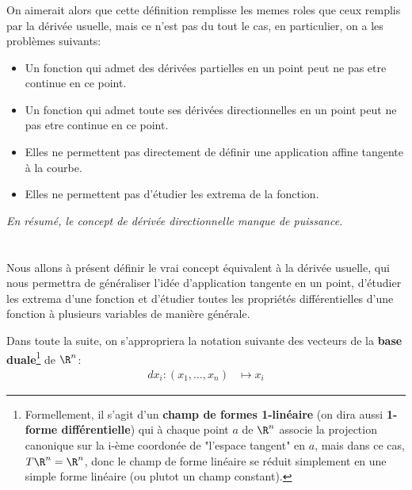 \subsection*{}
On aimerait alors que cette définition remplisse les memes roles que ceux remplis par la dérivée usuelle, mais ce n'est pas du tout le cas, en particulier, on a les problèmes suivants:
\begin{itemize}
   \item Un fonction qui admet des dérivées partielles en un point peut ne pas etre continue en ce point.
   \item Un fonction qui admet toute ses dérivées directionnelles en un point peut ne pas etre continue en ce point.
   \item Elles ne permettent pas directement de définir une application affine tangente à la courbe.
   \item Elles ne permettent pas d'étudier les extrema de la fonction.
\end{itemize}
\begin{center}
   \textit{En résumé, le concept de dérivée directionnelle manque de puissance.}
\end{center}

\chapter*{}
Nous allons à présent définir le vrai concept équivalent à la dérivée usuelle, qui nous permettra de généraliser l'idée d'application tangente en un point, d'étudier les extrema d'une fonction et d'étudier toutes les propriétés différentielles d'une fonction à plusieurs variables de manière générale.\<

Dans toute la suite, on s'appropriera la notation suivante des vecteurs de la \textbf{base duale}\footnote[1]{Formellement, il s'agit d'un \textbf{champ de formes 1-linéaire} (on dira aussi \textbf{1-forme différentielle}) qui à chaque point \(a\) de \(\R^n\) associe la projection canonique sur la i-ème coordonée de "l'espace tangent" en \(a\), mais dans ce cas, \(T\R^n = \R^n\), donc le champ de forme linéaire se réduit simplement en une simple forme linéaire (ou plutot un champ constant).} de \(\R^n\):
\[
   \begin{aligned}
      dx_i : (x_1, \ldots, x_n) &\longmapsto x_i 
   \end{aligned}
\]
